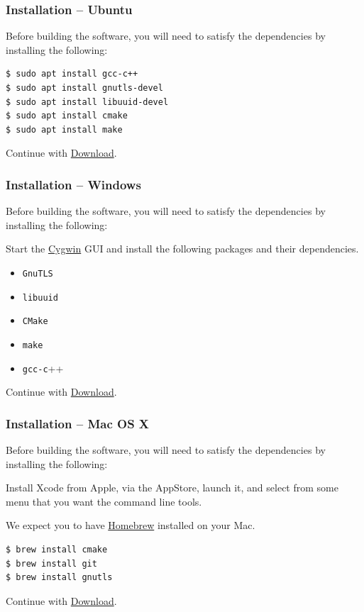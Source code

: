 \documentclass[t,handout]{beamer}
\begin{document}
\begin{frame}[fragile]\frametitle{Installation -- Ubuntu}\label{ubuntu}
    Before building the software, you will need to satisfy the dependencies by installing the following:

    \begin{lstlisting}
$ sudo apt install gcc-c++
$ sudo apt install gnutls-devel
$ sudo apt install libuuid-devel
$ sudo apt install cmake
$ sudo apt install make
    \end{lstlisting}

    Continue with \hyperlink{download}{Download}.
\end{frame}

\begin{frame}[fragile]\frametitle{Installation -- Windows}\label{windows}
    Before building the software, you will need to satisfy the dependencies by installing the following:

    Start the \href{https://cygwin.com}{Cygwin} GUI and install the following packages and their dependencies.

    \begin{itemize}
        \item \verb+GnuTLS+
        \item \verb+libuuid+
        \item \verb+CMake+
        \item \verb+make+
        \item \verb+gcc-c+++
    \end{itemize}

    Continue with \hyperlink{download}{Download}.
\end{frame}

\begin{frame}[fragile]\frametitle{Installation -- Mac OS X}\label{macosx}
    Before building the software, you will need to satisfy the dependencies by installing the following:

    Install Xcode from Apple, via the AppStore, launch it, and select from some menu that you want the command line tools.

    We expect you to have \href{http://brew.sh/}{Homebrew} installed on your Mac.

    \begin{lstlisting}
$ brew install cmake
$ brew install git
$ brew install gnutls
    \end{lstlisting}

    Continue with \hyperlink{download}{Download}.
\end{frame}
\end{document}
